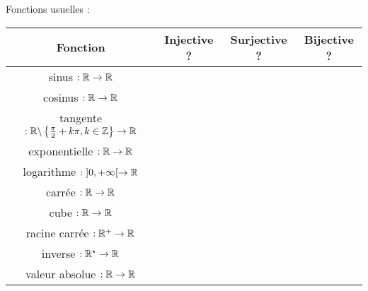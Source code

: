 \documentclass[a4paper, 11pt]{article}
\begin{document}
{%




\begin{exemple} Fonctions usuelles :\\

	\renewcommand{\arraystretch}{3.2}
	\begin{tabular}{|c|c|c|c|}
		\hline
		Fonction                                                                        & Injective ? & Surjective ? & Bijective ? \\
		\hline
		sinus $: \mathbb{R} \to \mathbb{R}$                                                             &             &              &             \\
		\hline
		cosinus $: \mathbb{R} \to \mathbb{R}$                                                           &             &              &             \\
		\hline
		tangente $: \mathbb{R}\backslash \left\{ \frac{\pi}{2} + k\pi, k \in \mathbb{Z}\right\} \to \mathbb{R}$ &             &              &             \\
		\hline
		exponentielle $: \mathbb{R} \to \mathbb{R}$                                                     &             &              &             \\
		\hline
		logarithme $: \; ]0,+\infty[ \to \mathbb{R}$                                            &             &              &             \\
		\hline
		carr\'ee $: \mathbb{R} \to \mathbb{R}$                                                          &             &              &             \\
		\hline
		cube $: \mathbb{R} \to \mathbb{R}$                                                              &             &              &             \\
		\hline
		racine carr\'ee $: \mathbb{R}^+ \to \mathbb{R}$                                                 &             &              &             \\
		\hline
		inverse $: \mathbb{R}^\star \to \mathbb{R}$                                                     &             &              &             \\
		\hline
		valeur absolue $: \mathbb{R} \to \mathbb{R}$                                                    &             &              &             \\

\end{tabular}
\end{exemple}}
\end{document}
